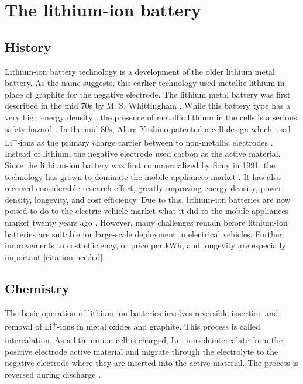 \documentclass[12pt]{article} %
\begin{document}
\section{The lithium-ion battery} %


\subsection{History} %

Lithium-ion battery technology is a development of the older lithium metal battery.
As the name suggests, this earlier technology used metallic lithium in place of graphite for the negative electrode.
The lithium metal battery was first described in the mid 70s by M. S. Whittingham \cite{whittingham_electrical_1976}.
While this battery type has a very high energy density \cite{van_schalkwijk_chapter_2002}, the presence of metallic lithium in the cells is a serious safety hazard \cite{lisbona_review_2011} \cite{eom_life_2007}.
In the mid 80s, Akira Yoshino patented a cell design which used Li\textsuperscript{+}-ions as the primary charge carrier between to non-metallic electrodes \cite{yoshio_chapter_2009} \cite{yoshino_secondary_1987}.
Instead of lithium, the negative electrode used carbon as the active material.
Since the lithium-ion battery was first commercialized by Sony in 1991, the technology has grown to dominate the mobile appliances market \cite{yoshio_chapter_2009-1}.
It has also received considerable research effort, greatly improving energy density, power density, longevity, and cost efficiency.
Due to this, lithium-ion batteries are now poised to do to the electric vehicle market what it did to the mobile appliances market twenty years ago \cite{reddy_thomas_section_2011}.
However, many challenges remain before lithium-ion batteries are suitable for large-scale deployment in electrical vehicles.
Further improvements to cost efficiency, or price per kWh, and longevity are especially important [citation needed].


\subsection{Chemistry} %

The basic operation of lithium-ion batteries involves reversible insertion and removal of Li\textsuperscript{+}-ions in metal oxides and graphite.
This process is called intercalation.
As a lithium-ion cell is charged, Li\textsuperscript{+}-ions deintercalate from the positive electrode active material and migrate through the electrolyte to the negative electrode where they are inserted into the active material.
The process is reversed during discharge \cite{reddy_thomas_section_2011-1}.
\end{document}
